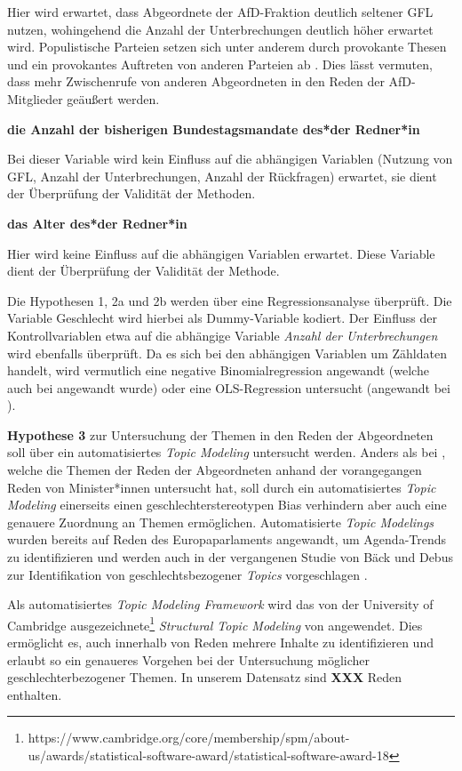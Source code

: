 \documentclass[12pt, 
    twoside=false, 
    bibliography=totoc, 
    numbers=endperiod, 
    headings=normal, 
    toc=chapterentrydotfill
    ]{scrbook}
\begin{document}
Hier wird erwartet, dass Abgeordnete der AfD-Fraktion deutlich seltener GFL nutzen, wohingehend die Anzahl der Unterbrechungen deutlich höher erwartet wird. Populistische Parteien setzen sich unter anderem durch provokante Thesen und ein provokantes Auftreten von anderen Parteien ab \parencites[vgl.][]{decker_populismus_2006}{priester_2012}. Dies lässt vermuten, dass mehr Zwischenrufe von anderen Abgeordneten in den Reden der AfD-Mitglieder geäußert werden.

\textbf{die Anzahl der bisherigen Bundestagsmandate des*der Redner*in}

Bei dieser Variable wird kein Einfluss auf die abhängigen Variablen (Nutzung von GFL, Anzahl der Unterbrechungen, Anzahl der Rückfragen) erwartet, sie dient der Überprüfung der Validität der Methoden.

\textbf{das Alter des*der Redner*in}

Hier wird keine Einfluss auf die abhängigen Variablen erwartet. Diese Variable dient der Überprüfung der Validität der Methode.

Die {Hypothesen 1, 2a und 2b} werden über eine Regressionsanalyse überprüft. Die Variable Geschlecht wird hierbei als Dummy-Variable kodiert. Der Einfluss der Kontrollvariablen etwa auf die abhängige Variable \emph{Anzahl der Unterbrechungen} wird ebenfalls überprüft. Da es sich bei den abhängigen Variablen um Zähldaten handelt, wird vermutlich eine negative Binomialregression angewandt (welche auch bei \textcite{back_2014} angewandt wurde) oder eine OLS-Regression untersucht (angewandt bei \textcite{coffe_2013}).


\textbf{Hypothese 3} zur Untersuchung der Themen in den Reden der Abgeordneten soll über ein automatisiertes \emph{Topic Modeling} untersucht werden. Anders als bei \textcite{back_2014}, welche die Themen der Reden der Abgeordneten anhand der vorangegangen Reden von Minister*innen untersucht hat, soll durch ein automatisiertes \emph{Topic Modeling} einerseits einen geschlechterstereotypen Bias verhindern aber auch eine genauere Zuordnung an Themen ermöglichen. 
Automatisierte \emph{Topic Modelings} wurden bereits auf Reden des Europaparlaments angewandt, um Agenda-Trends zu identifizieren \parencite[vgl.][]{greene_2016} und werden auch in der vergangenen Studie von Bäck und Debus zur Identifikation von geschlechtsbezogener \emph{Topics} vorgeschlagen \parencite*[18]{back_2018}.

Als automatisiertes \emph{Topic Modeling Framework} wird das von der University of Cambridge ausgezeichnete\footnote{https://www.cambridge.org/core/membership/spm/about-us/awards/statistical-software-award/statistical-software-award-18} \emph{Structural Topic Modeling} von \textcite{roberts_2018} angewendet. Dies ermöglicht es, auch innerhalb von Reden mehrere Inhalte zu identifizieren und erlaubt so ein genaueres Vorgehen bei der Untersuchung möglicher geschlechterbezogener Themen. In unserem Datensatz sind \textbf{XXX} Reden enthalten.
\end{document}
